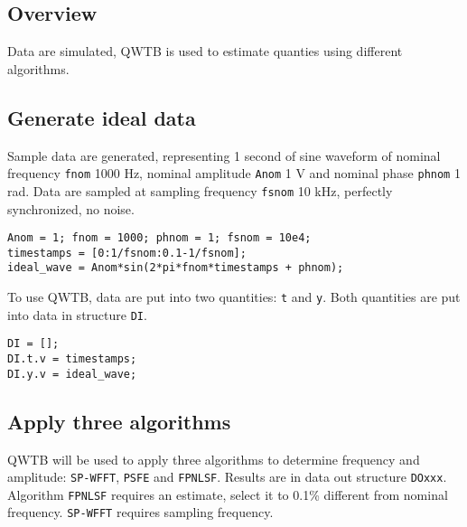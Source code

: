 \startcontents[localtoc]



{}
\subsection*{Overview}



Data are simulated, QWTB is used to estimate quanties using different
algorithms.



{}
\subsection*{Generate ideal data}



Sample data are generated, representing 1 second of sine waveform of nominal
frequency \texttt{fnom} 1000 Hz, nominal amplitude \texttt{Anom} 1 V and nominal phase
\texttt{phnom} 1 rad. Data are sampled at sampling frequency \texttt{fsnom} 10 kHz,
perfectly synchronized, no noise.

\begin{lstlisting}
Anom = 1; fnom = 1000; phnom = 1; fsnom = 10e4;
timestamps = [0:1/fsnom:0.1-1/fsnom];
ideal_wave = Anom*sin(2*pi*fnom*timestamps + phnom);
\end{lstlisting}


To use QWTB, data are put into two quantities: \texttt{t} and \texttt{y}. Both quantities
are put into data in structure \texttt{DI}.

\begin{lstlisting}
DI = [];
DI.t.v = timestamps;
DI.y.v = ideal_wave;
\end{lstlisting}


{}
\subsection*{Apply three algorithms}



QWTB will be used to apply three algorithms to determine frequency and
amplitude: \texttt{SP-WFFT}, \texttt{PSFE} and \texttt{FPNLSF}. Results are in data out structure
\texttt{DOxxx}. Algorithm \texttt{FPNLSF} requires an estimate, select it to 0.1\% different
from nominal frequency. \texttt{SP-WFFT} requires sampling frequency.

